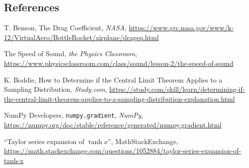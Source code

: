 \documentclass[12pt]{article}
\begin{document}
\subsection*{References}
\begin{enumerate}[label={[\arabic*]}]
    \item \label{sec:1} T. Benson, The Drag Coefficient, \textit{NASA}, \url{https://www.grc.nasa.gov/www/k-12/VirtualAero/BottleRocket/airplane/drageq.html}
    \item \label{sec:2} The Speed of Sound, \textit{the Physics Classroom}, \url{https://www.physicsclassroom.com/class/sound/lesson-2/the-speed-of-sound}
    \item \label{sec:3} K. Boddie, How to Determine if the Central Limit Theorem Applies to a Sampling Distribution, \textit{Study.com}, \url{https://study.com/skill/learn/determining-if-the-central-limit-theorem-applies-to-a-sampling-distribution-explanation.html}
    \item \label{sec:4} NumPy Developers, \texttt{numpy.gradient}, \textit{NumPy}, \url{https://numpy.org/doc/stable/reference/generated/numpy.gradient.html}
    \item \label{sec:5} ``Taylor series expansion of $\tanh x$'', MathStackExchange, \url{https://math.stackexchange.com/questions/1052884/taylor-series-expansion-of-tanh-x}
\end{enumerate}




\end{document}
